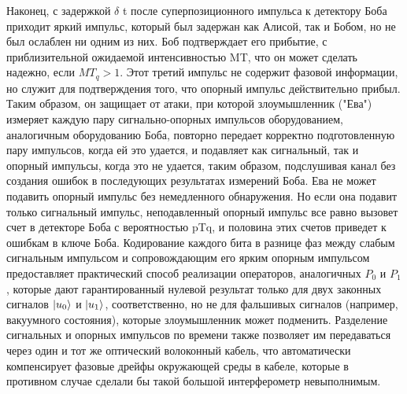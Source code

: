 Наконец, с задержкой $\delta$ t после суперпозиционного импульса к детектору Боба приходит яркий импульс, который был задержан как Алисой, так и Бобом, но не был ослаблен ни одним из них. Боб подтверждает его прибытие, с приблизительной ожидаемой интенсивностью MT, что он может сделать надежно, если $MT_q > 1$. Этот третий импульс не содержит фазовой информации, но служит для подтверждения того, что опорный импульс действительно прибыл. Таким образом, он защищает от атаки, при которой злоумышленник ("Ева") измеряет каждую пару сигнально-опорных импульсов оборудованием, аналогичным оборудованию Боба, повторно передает корректно подготовленную пару импульсов, когда ей это удается, и подавляет как сигнальный, так и опорный импульсы, когда это не удается, таким образом, подслушивая канал без создания ошибок в последующих результатах измерений Боба. Ева не может подавить опорный импульс без немедленного обнаружения. Но если она подавит только сигнальный импульс, неподавленный опорный импульс все равно вызовет счет в детекторе Боба с вероятностью pTq, и половина этих счетов приведет к ошибкам в ключе Боба.
Кодирование каждого бита в разнице фаз между слабым сигнальным импульсом и сопровождающим его ярким опорным импульсом предоставляет практический способ реализации операторов, аналогичных $P_0$ и $P_1$, которые дают гарантированный нулевой результат только для двух законных сигналов $\lvert u_0\rangle$ и $\lvert u_1\rangle$, соответственно, но не для фальшивых сигналов (например, вакуумного состояния), которые злоумышленник может подменить. Разделение сигнальных и опорных импульсов по времени также позволяет им передаваться через один и тот же оптический волоконный кабель, что автоматически компенсирует фазовые дрейфы окружающей среды в кабеле, которые в противном случае сделали бы такой большой интерферометр невыполнимым.

